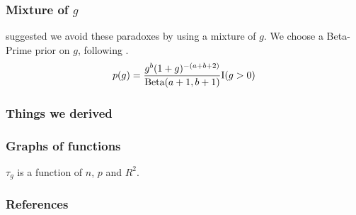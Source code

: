 \documentclass{beamer}
\begin{document}
\begin{frame}
	\frametitle{Mixture of $g$}
	\citep{Liang2008} suggested we avoid these paradoxes by using a mixture of $g$.
	We choose a Beta-Prime prior on $g$, following \citep{Maruyama2011}.
	\[
		p(g) = \frac{g^b (1 + g)^{-(a + b + 2)}}{\text{Beta}(a + 1, b + 1)} \text{I}(g > 0)
	\]
\end{frame}

\begin{frame}
	\frametitle{Things we derived}
	
\end{frame}

\begin{frame}
	\frametitle{Graphs of functions}
	$\tau_g$ is a function of $n$, $p$ and $R^2$.
\end{frame}

\begin{frame}
	\frametitle{References}
	
	
\end{frame}
			
\end{document}
